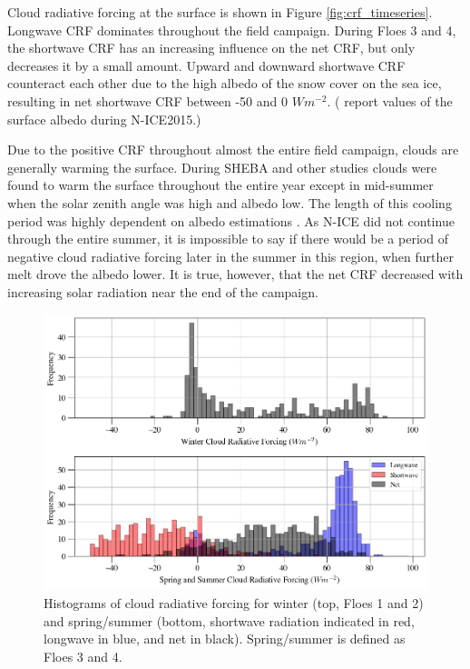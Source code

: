 Cloud radiative forcing at the surface is shown in Figure \ref{fig:crf_timeseries}. Longwave CRF dominates throughout the field campaign. During Floes 3 and 4, the shortwave CRF has an increasing influence on the net CRF, but only decreases it by a small amount. Upward and downward shortwave CRF counteract each other due to the high albedo of the snow cover on the sea ice, resulting in net shortwave CRF between -50 and 0 $Wm^{-2}$. (\citet{walden:2017} report values of the surface albedo during N-ICE2015.) 

Due to the positive CRF throughout almost the entire field campaign, clouds are generally warming the surface. During SHEBA and other studies \citep{schweiger:2004, cogley:1984, walsh:1998, curry:1996} clouds were found to warm the surface throughout the entire year except in mid-summer when the solar zenith angle was high and albedo low. The length of this cooling period was highly dependent on albedo estimations \citep{intrieri:2002}. As N-ICE did not continue through the entire summer, it is impossible to say if there would be a period of negative cloud radiative forcing later in the summer in this region, when further melt drove the albedo lower. It is true, however, that the net CRF decreased with increasing solar radiation near the end of the campaign.

\begin{figure}[t!]
    \centering
    \includegraphics[width=1\linewidth]{figures/chapter4/ForcingValues.png}
    \caption[Histograms of cloud radiative forcing by season.]{Histograms of cloud radiative forcing for winter (top, Floes 1 and 2) and spring/summer (bottom, shortwave radiation indicated in red, longwave in blue, and net in black). Spring/summer is defined as Floes 3 and 4.}
    \label{fig:crf_histo}
\end{figure}

